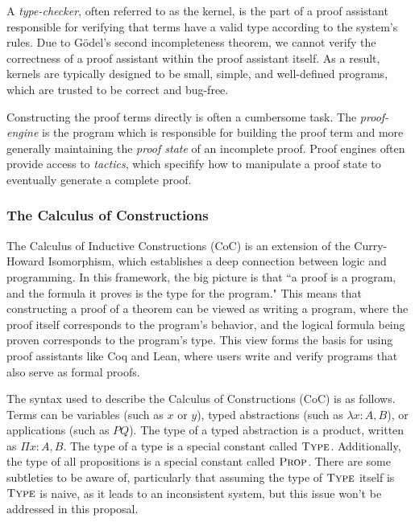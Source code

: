 \documentclass[12pt]{extarticle}
\begin{document}
	A \textit{type-checker}, often referred to as the kernel, is the part of a proof assistant responsible for verifying that terms have a valid type according to the system's rules. Due to G\"{o}del's second incompleteness theorem, we cannot verify the correctness of a proof assistant within the proof assistant itself. As a result, kernels are typically designed to be small, simple, and well-defined programs, which are trusted to be correct and bug-free.

	Constructing the proof terms directly is often a cumbersome task. The \textit{proof-engine} is the program which is responsible for building the proof term and more generally maintaining the \textit{proof state} of an incomplete proof. Proof engines often provide access to \textit{tactics}, which specifify how to manipulate a proof state to eventually generate a complete proof.

	\subsubsection{The Calculus of Constructions}
	\label{coc}
	The Calculus of Inductive Constructions (CoC) is an extension of the Curry-Howard Isomorphism, which establishes a deep connection between logic and programming. In this framework, the big picture is that ``a proof is a program, and the formula it proves is the type for the program." This means that constructing a proof of a theorem can be viewed as writing a program, where the proof itself corresponds to the program's behavior, and the logical formula being proven corresponds to the program's type. This view forms the basis for using proof assistants like Coq and Lean, where users write and verify programs that also serve as formal proofs.

	The syntax used to describe the Calculus of Constructions (CoC) is as follows. Terms can be variables (such as $x$ or $y$), typed abstractions (such as $\lambda x: A, B$), or applications (such as $P Q$). The type of a typed abstraction is a product, written as $\Pi x: A, B$. The type of a type is a special constant called $\textsc{Type}$. Additionally, the type of all propositions is a special constant called $\textsc{Prop}$. There are some subtleties to be aware of, particularly that assuming the type of $\textsc{Type}$ itself is $\textsc{Type}$ is naive, as it leads to an inconsistent system, but this issue won't be addressed in this proposal.
\end{document}
